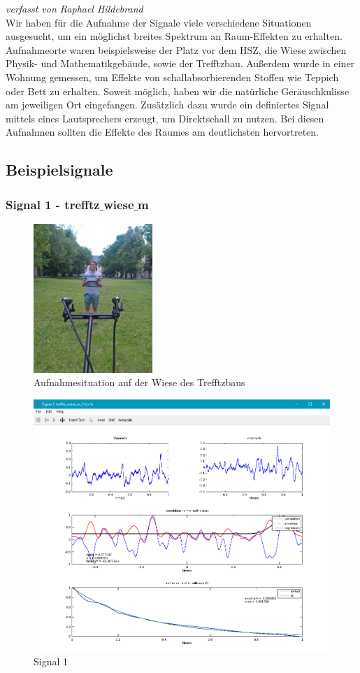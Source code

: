 \small\textit{verfasst von Raphael Hildebrand\\}
\normalsize
Wir haben für die Aufnahme der Signale viele verschiedene Situationen ausgesucht, um ein möglichst breites Spektrum an Raum-Effekten zu erhalten. Aufnahmeorte waren beispielsweise der Platz vor dem HSZ, die Wiese zwischen Physik- und Mathematikgebäude, sowie der Trefftzbau. Außerdem wurde in einer Wohnung gemessen, um Effekte von schallabsorbierenden Stoffen wie Teppich oder Bett zu erhalten. Soweit möglich, haben wir die natürliche Geräuschkulisse am jeweiligen Ort eingefangen. Zusätzlich dazu wurde ein definiertes Signal mittels eines Lautsprechers erzeugt, um Direktschall zu nutzen. Bei diesen Aufnahmen sollten die Effekte des Raumes am deutlichsten hervortreten.
\subsection{Beispielsignale}
\subsubsection{Signal 1 - trefftz$\_$wiese$\_$m}
\begin{figure}[ht!]
  \centering
  \includegraphics[width=0.4\textwidth]{img/wiese}
  \caption{Aufnahmesituation auf der Wiese des Trefftzbaus}
  \label{figure4}
\end{figure}
\begin{figure}[ht!]
  \centering
  \includegraphics[scale=0.6]{img/trefftz_wiese_m}
  \caption{Signal 1}
  \label{figure2}
\end{figure}
